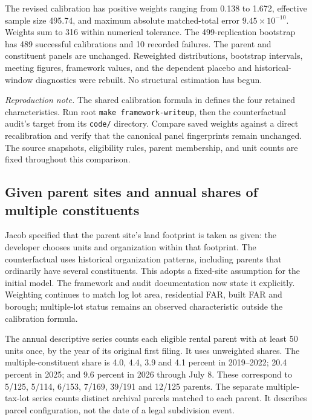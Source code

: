 The revised calibration has positive weights ranging from 0.138 to 1.672,
effective sample size 495.74, and maximum absolute matched-total error
$9.45\times10^{-10}$. Weights sum to 316 within numerical tolerance. The
499-replication bootstrap has 489 successful calibrations and 10 recorded
failures. The parent and constituent panels are unchanged. Reweighted
distributions, bootstrap intervals, meeting figures, framework values, and
the dependent placebo and historical-window diagnostics were rebuilt. No
structural estimation has begun.

\textit{Reproduction note.} The shared calibration formula in
 defines the four retained
characteristics. Run root \texttt{make framework-writeup}, then the
counterfactual audit's  target from its
\texttt{code/} directory. Compare saved weights against a direct recalibration
and verify that the canonical panel fingerprints remain unchanged. The
source snapshots, eligibility rules, parent membership, and unit counts are
fixed throughout this comparison.

\clearpage
\subsection*{Given parent sites and annual shares of multiple constituents}

Jacob specified that the parent site's land footprint is taken as given:
the developer chooses units and organization within that footprint. The
counterfactual uses historical organization patterns, including parents that
ordinarily have several constituents. This adopts a fixed-site assumption
for the initial model. The framework and audit documentation now state it
explicitly. Weighting continues to match log lot area, residential FAR,
built FAR and borough; multiple-lot status remains an observed characteristic
outside the calibration formula.

The annual descriptive series counts each eligible rental parent with at
least 50 units once, by the year of its original first filing. It uses
unweighted shares. The multiple-constituent share is 4.0, 4.4, 3.9 and 4.1
percent in 2019--2022; 20.4 percent in 2025; and 9.6 percent in 2026 through
July 8. These correspond to 5/125, 5/114, 6/153, 7/169, 39/191 and 12/125
parents. The separate multiple-tax-lot series counts distinct archival
parcels matched to each parent. It describes parcel configuration, not the
date of a legal subdivision event.

